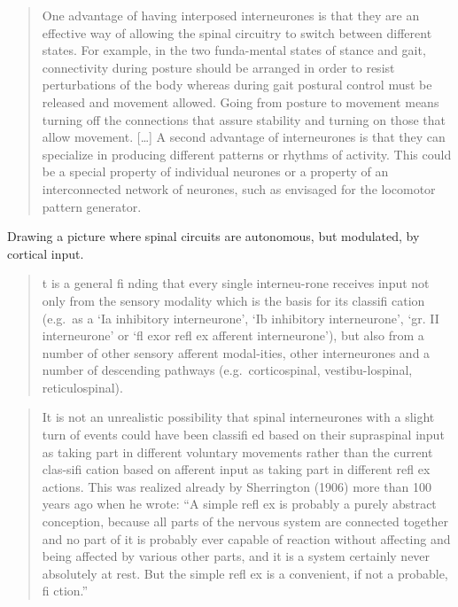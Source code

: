 \documentclass[../main.tex]{subfiles}
\begin{document}
{{{\begin{quote}
One advantage of having interposed interneurones is that they are an
effective way of allowing the spinal circuitry to switch between
different states. For example, in the two funda-mental states of stance
and gait, connectivity during posture should be arranged in order to
resist perturbations of the body whereas during gait postural control
must be released and movement allowed. Going from posture to movement
means turning off the connections that assure stability and turning on
those that allow movement. {[}\ldots{]} A second advantage of
interneurones is that they can specialize in producing different
patterns or rhythms of activity. This could be a special property of
individual neurones or a property of an interconnected network of
neurones, such as envisaged for the locomotor pattern generator.
\end{quote}

Drawing a picture where spinal circuits are autonomous, but modulated,
by cortical input.

\begin{quote}
t is a general fi nding that every single interneu-rone receives input
not only from the sensory modality which is the basis for its classifi
cation (e.g.~as a `Ia inhibitory interneurone', `Ib inhibitory
interneurone', `gr. II interneurone' or `fl exor refl ex afferent
interneurone'), but also from a number of other sensory afferent
modal-ities, other interneurones and a number of descending pathways
(e.g.~corticospinal, vestibu-lospinal, reticulospinal).
\end{quote}

\begin{quote}
It is not an unrealistic possibility that spinal interneurones with a
slight turn of events could have been classifi ed based on their
supraspinal input as taking part in different voluntary movements rather
than the current clas-sifi cation based on afferent input as taking part
in different refl ex actions. This was realized already by Sherrington
(1906) more than 100 years ago when he wrote: ``A simple refl ex is
probably a purely abstract conception, because all parts of the nervous
system are connected together and no part of it is probably ever capable
of reaction without affecting and being affected by various other parts,
and it is a system certainly never absolutely at rest. But the simple
refl ex is a convenient, if not a probable, fi ction.''
\end{quote}

}}}
\end{document}
